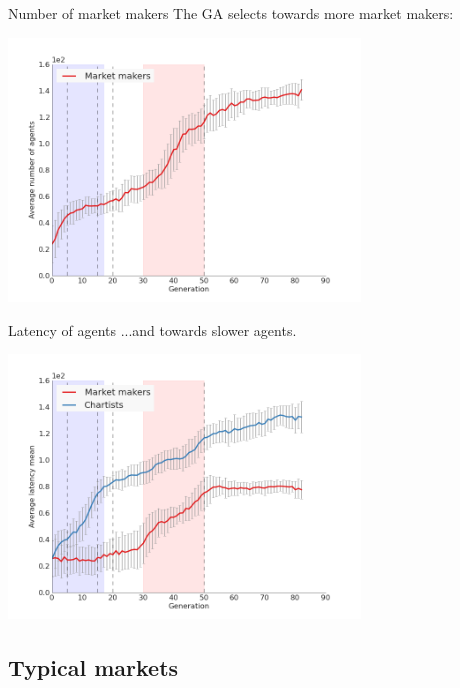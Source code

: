 \documentclass[14pt]{beamer}
\begin{document}
\begin{frame}{Number of market makers}
The GA selects towards more market makers:
\begin{center}
\includegraphics[width=0.7\textwidth]{evolution/nAgents.png}
\end{center}
\end{frame}

\begin{frame}{Latency of agents}
...and towards slower agents.
\begin{center}
\includegraphics[width=0.7\textwidth]{evolution/latpars_mu.png}
\end{center}
\end{frame}

\subsection{Typical markets}
\begin{frame}
\tableofcontents[currentsubsection]
\end{frame}
\end{document}
